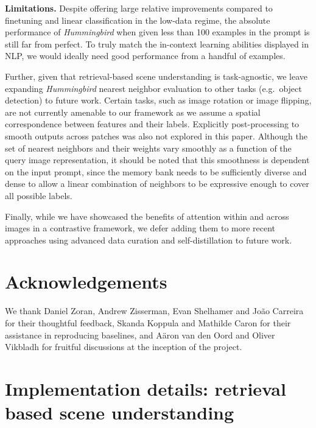 \documentclass{article}
\newcommand{\ours}{\textit{Hummingbird} }
\begin{document}
\textbf{Limitations. } Despite offering large relative improvements compared to finetuning and linear classification in the low-data regime, the absolute performance of \ours when given less than 100 examples in the prompt is still far from perfect. To truly match the in-context learning abilities displayed in NLP, we would ideally need good performance from a handful of examples. 

Further, given that retrieval-based scene understanding is task-agnostic, we leave expanding \ours nearest neighbor evaluation to other tasks (e.g.\ object detection) to future work. Certain tasks, such as image rotation or image flipping, are not currently amenable to our framework as we assume a spatial correspondence between features and their labels. Explicitly post-processing to smooth outputs across patches was also not explored in this paper. Although the set of nearest neighbors and their weights vary smoothly as a function of the query image representation, it should be noted that this smoothness is dependent on the input prompt, since the memory bank needs to be sufficiently diverse and dense to allow a linear combination of neighbors to be expressive enough to cover all possible labels. 

Finally, while we have showcased the benefits of attention within and across images in a contrastive framework, we defer adding them to more recent approaches using advanced data curation \cite{oquab2023dinov2} and self-distillation \cite{caron2021emerging, zhou2021ibot} to future work.

\section*{Acknowledgements}
We thank Daniel Zoran, Andrew Zisserman, Evan Shelhamer and Jo\~{a}o Carreira for their thoughtful feedback, Skanda Koppula and Mathilde Caron for their assistance in reproducing baselines, and A\"{a}ron van den Oord and Oliver Vikbladh for fruitful discussions at the inception of the project. 


%

% 
% 


\clearpage

\appendix

\section{Implementation details: retrieval based scene understanding}
\end{document}
